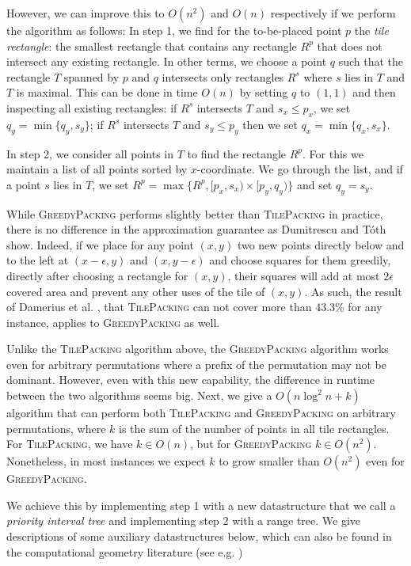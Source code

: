 \documentclass[11pt, a4paper, twocolumn]{article}
\begin{document}
However, we can improve this to $O(n^2)$ and $O(n)$ respectively if we perform the algorithm as follows:
In step 1, we find for the to-be-placed point $p$ the \textit{tile rectangle}: the smallest rectangle
that contains any rectangle $R^p$ that does not intersect any existing rectangle. In other terms,
we choose a point $q$ such that the rectangle $T$ spanned by $p$ and $q$ intersects only rectangles $R^s$
where $s$ lies in $T$ and $T$ is maximal. This can be done in time $O(n)$ by setting $q$ to $(1,1)$
and then inspecting all existing rectangles: if $R^s$ intersects $T$ and $s_x \leq p_x$,
we set $q_y = \min \{q_y, s_y\}$; if $R^s$ intersects $T$ and $s_y \leq p_y$ then we set $q_x = \min \{q_x, s_x\}$.

In step 2, we consider all points in $T$ to find the rectangle $R^p$. For this we maintain a list
of all points sorted by $x$-coordinate. We go through the list, and if a point $s$
lies in $T$, we set $R^p = \max \{R^p, [p_x, s_x) \times [p_y, q_y)\}$ and set $q_y = s_y$.

While \textsc{GreedyPacking} performs slightly better than \textsc{TilePacking}
in practice, there is no difference in the approximation guarantee
as Dumitrescu and Tóth \cite{dumitrescu2015packing} show. Indeed, if we place for
any point $(x,y)$ two new points directly below and to the left
at $(x - \epsilon, y)$ and $(x, y - \epsilon)$ and choose squares for them
greedily, directly after choosing a rectangle for $(x, y)$, their squares
will add at most $2\epsilon$ covered area and prevent any other uses of the tile of $(x, y)$.
As such, the result of Damerius et al. \cite{damerius2021greedily}, that \textsc{TilePacking} can not
cover more than 43.3\% for any instance, applies to \textsc{GreedyPacking} as well.

Unlike the \textsc{TilePacking} algorithm above, the \textsc{GreedyPacking} algorithm works even
for arbitrary permutations where a prefix of the permutation may not be dominant.
However, even with this new capability, the difference in runtime between the two algorithms seems big.
Next, we give a $O(n\log^2 n + k)$ algorithm that can perform both \textsc{TilePacking} and \textsc{GreedyPacking} on arbitrary permutations,
where $k$ is the sum of the number of points in all tile rectangles. For \textsc{TilePacking},
we have $k \in O(n)$, but for \textsc{GreedyPacking} $k \in O(n^2)$. Nonetheless,
in most instances we expect $k$ to grow smaller than $O(n^2)$ even for \textsc{GreedyPacking}.

We achieve this by implementing step 1 with a new datastructure that we call
a \textit{priority interval tree} and implementing step 2 with a range tree.
We give descriptions of some auxiliary datastructures below, which can also
be found in the computational geometry literature (see e.g. \cite[p.~135]{klein2006algorithmische})
\end{document}
